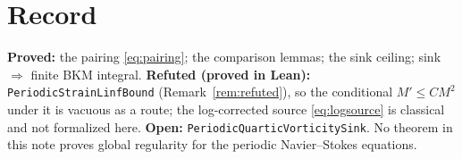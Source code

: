 \documentclass[11pt]{article}
\theoremstyle{definition}
\theoremstyle{remark}
\begin{document}
\section{Record}
\textbf{Proved:} the pairing \eqref{eq:pairing}; the comparison lemmas; the sink ceiling; sink $\Rightarrow$ finite BKM integral. \textbf{Refuted (proved in Lean):} \texttt{PeriodicStrainLinfBound} (Remark~\ref{rem:refuted}), so the conditional $M'\le CM^2$ under it is vacuous as a route; the log-corrected source \eqref{eq:logsource} is classical and not formalized here. \textbf{Open:} \texttt{PeriodicQuarticVorticitySink}. No theorem in this note proves global regularity for the periodic Navier--Stokes equations.
\end{document}
